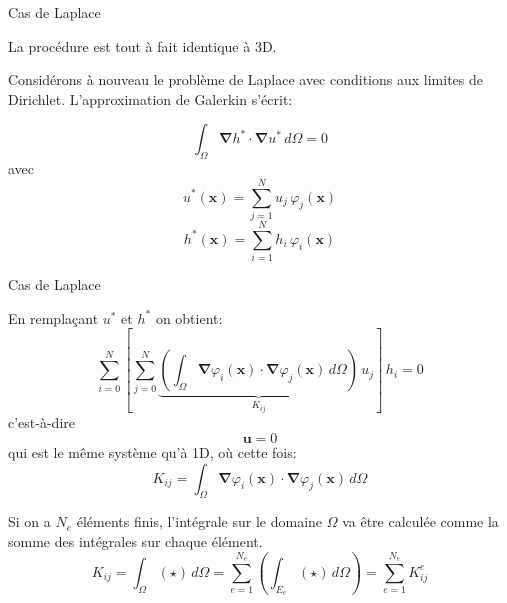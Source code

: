 \documentclass[
mode=present,    %
paper=a4paper,   %
orient=landscape,
display=slides,   %
size=10pt,     %
style=romain   %
]{powerdot}
\begin{document}
\begin{slide}{Cas de Laplace}

La procédure est tout à fait identique à 3D.

\bigskip

Considérons à nouveau le problème de Laplace avec conditions aux limites de Dirichlet. L'approximation de Galerkin s'écrit:

\begin{equation*}
      \int_{\Omega} \boldsymbol{\nabla} h^* \cdot \boldsymbol{\nabla} u^* \,d\Omega
     =
     0
\end{equation*}
avec
\begin{equation*}
     u^*(\boldsymbol{x}) = \sum_{j=1}^N u_j \,\varphi_j(\boldsymbol{x})
\end{equation*}
\begin{equation*}
     h^*(\boldsymbol{x}) = \sum_{i=1}^N h_i \,\varphi_i(\boldsymbol{x})
\end{equation*}

\end{slide}



\begin{slide}[toc=]{Cas de Laplace}

En remplaçant $u^*$ et $h^*$ on obtient:
\begin{equation*}
    \sum_{i=0}^N \left[ \sum_{j=0}^N\underbrace{\left( \int_{\Omega} \boldsymbol{\nabla} \varphi_i(\boldsymbol{x})\cdot
    \boldsymbol{\nabla} \varphi_j(\boldsymbol{x})  \, d\Omega \right)}_{K_{ij}} \, u_j \right] \,  h_i
     = 0
\end{equation*}
c'est-à-dire
\begin{equation*}
    [K] \boldsymbol{u} = 0
\end{equation*}
qui est le même système qu'à 1D, où cette fois:
\begin{equation*}
    K_{ij} = \int_{\Omega} \boldsymbol{\nabla} \varphi_i(\boldsymbol{x})\cdot
    \boldsymbol{\nabla} \varphi_j(\boldsymbol{x})  \, d\Omega
\end{equation*}

\bigskip

Si on a $N_e$ éléments finis, l'intégrale sur le domaine $\Omega$ va être calculée comme la somme des intégrales sur chaque élément.
\begin{equation*}
    K_{ij} = \int_{\Omega} (\star)  \, d\Omega
    = \sum_{e=1}^{N_e} \left( \int_{E_e} (\star)  \, d\Omega \right)
    = \sum_{e=1}^{N_e} K^e_{ij}
\end{equation*}

\end{slide}
\end{document}
